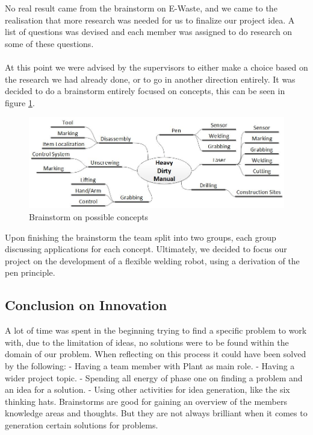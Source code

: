 No real result came from the brainstorm on E-Waste, and we came to the realisation that more research was needed for us to finalize our project idea. A list of questions was devised and each member was assigned to do research on some of these questions. \\~~\\
At this point we were advised by the supervisors to either make a choice based on the research we had already done, or to go in another direction entirely. It was decided to do a brainstorm entirely focused on concepts, this can be seen in figure \ref{fig:conceptsBrainstorm}.

\begin{figure}[!ht]
	\centering
	\includegraphics[scale=.5]{./graphics/conceptsBrainstorm.jpg}
	\caption{Brainstorm on possible concepts}
	\label{fig:conceptsBrainstorm}
\end{figure}

Upon finishing the brainstorm the team split into two groups, each group discussing applications for each concept. Ultimately, we decided to focus our project on the development of a flexible welding robot, using a derivation of the pen principle.

\subsection{Conclusion on Innovation}
A lot of time was spent in the beginning trying to find a specific problem to work with, due to the limitation of ideas, no solutions were to be found within the domain of our problem. When reflecting on this process it could have been solved by the following:
- Having a team member with Plant as main role.
- Having a wider project topic.
- Spending all energy of phase one on finding a problem and an idea for a solution.
- Using other activities for idea generation, like the six thinking hats. 
Brainstorms are good for gaining an overview of the members knowledge areas and thoughts. But they are not always brilliant when it comes to generation certain solutions for problems. 
